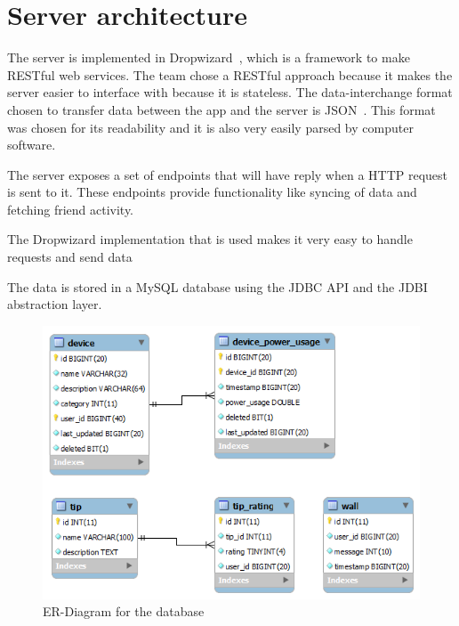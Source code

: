 \section{Server architecture}
The server is implemented in Dropwizard~\cite{dropwizard}, which is a framework to make RESTful web services. The team chose a RESTful approach because it makes the server easier to interface 
with because it is stateless. The data-interchange format chosen to transfer data between the app and the server is JSON~\cite{json}. This format was chosen for its readability and it is also 
very easily parsed by computer software.

The server exposes a set of endpoints that will have reply when a HTTP request is sent to it. These endpoints provide functionality like syncing of data and fetching friend activity.

The Dropwizard implementation that is used makes it very easy to handle requests and send data 

The data is stored in a MySQL database using the JDBC API and the JDBI abstraction layer.

\begin{figure}[H]
\includegraphics[width=\textwidth]{ch/architecture/fig/ER-Diagram.png}
\caption{ER-Diagram for the database}
\label{fig:ER-Diagram}
\end{figure}